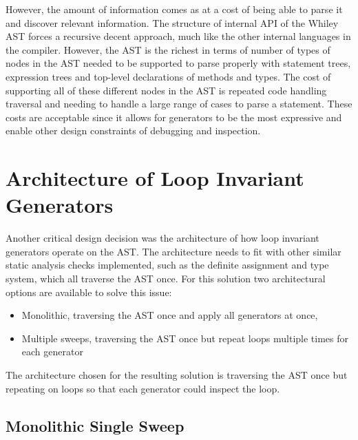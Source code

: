 However, the amount of information comes as at a cost of being able to parse
it and discover relevant information.
The structure of internal API of the Whiley AST forces a recursive decent
approach, much like the other internal languages in the compiler.
However, the AST is the richest in terms of number of types of nodes
in the AST needed to be supported to parse properly with
statement trees, expression trees and top-level declarations of methods and
types.
The cost of supporting all of these different nodes in the AST is
repeated code handling traversal and needing to handle a large range
of cases to parse a statement.
These costs are acceptable since it allows for generators to be
the most expressive and enable other design constraints of
debugging and inspection.

\section{Architecture of Loop Invariant Generators}

Another critical design decision was the architecture of how loop invariant
generators operate on the AST.
The architecture needs to fit with other similar static analysis checks
implemented, such as the definite assignment and type system, which all
traverse the AST once.
For this solution two architectural options are available to solve this issue:

\begin{itemize}
	\item{Monolithic, traversing the AST once and apply all generators at once,}
	\item{Multiple sweeps, traversing the AST once but repeat loops multiple times for each generator}
\end{itemize}

The architecture chosen for the resulting solution is  traversing the AST once
but repeating on loops so that each generator could inspect the loop.

\subsection{Monolithic Single Sweep}

